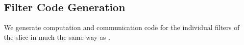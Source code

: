 \subsection{Filter Code Generation}
We generate computation and communication code for the individual
filters of the slice in much the same way as \cite{streamit-asplos}.  



